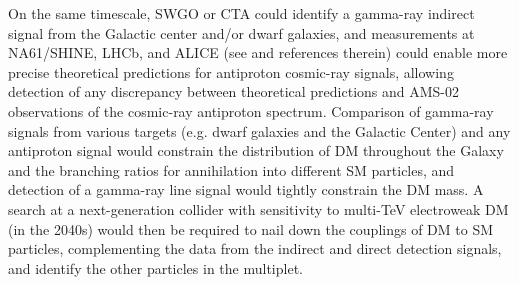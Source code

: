 \documentclass[nofootinbib]{article}
\begin{document}
On the same timescale, SWGO or CTA could identify a gamma-ray indirect signal from the Galactic center and/or dwarf galaxies, and measurements at NA61/SHINE, LHCb, and ALICE (see \cite{CF1WP5} and references therein) could enable more precise theoretical predictions for antiproton cosmic-ray signals, allowing detection of any discrepancy between theoretical predictions and AMS-02 observations of the cosmic-ray antiproton spectrum. Comparison of gamma-ray signals from various targets (e.g. dwarf galaxies and the Galactic Center) and any antiproton signal would constrain the distribution of DM throughout the Galaxy and the branching ratios for annihilation into different SM particles, and detection of a gamma-ray line signal would tightly constrain the DM mass. A search at a next-generation collider with sensitivity to multi-TeV electroweak DM (in the 2040s) would then be required to nail down the couplings of DM to SM particles, complementing the  data from the indirect and direct detection signals, and identify the other particles in the multiplet.
\end{document}
